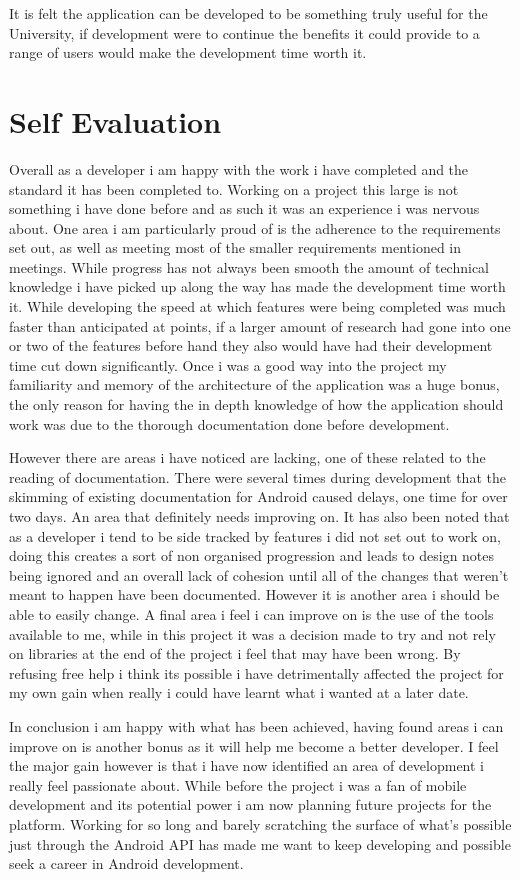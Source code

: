 It is felt the application can be developed to be something truly useful for the University, if development were to continue the benefits it could provide to a range of users would make the development time worth it. 
\section{Self Evaluation}
Overall as a developer i am happy with the work i have completed and the standard it has been completed to. Working on a project this large is not something i have done before and as such it was an experience i was nervous about. One area i am particularly proud of is the adherence to the requirements set out, as well as meeting most of the smaller requirements mentioned in meetings. While progress has not always been smooth the amount of technical knowledge i have picked up along the way has made the development time worth it. While developing the speed at which features were being completed was much faster than anticipated at points, if a larger amount of research had gone into one or two of the features before hand they also would have had their development time cut down significantly. Once i was a good way into the project my familiarity and memory of the architecture of the application was a huge bonus, the only reason for having the in depth knowledge of how the application should work was due to the thorough documentation done before development. 

However there are areas i have noticed are lacking, one of these related to the reading of documentation. There were several times during development that the skimming of existing documentation for Android caused delays, one time for over two days. An area that definitely needs improving on. It has also been noted that as a developer i tend to be side tracked by features i did not set out to work on, doing this creates a sort of non organised progression and leads to design notes being ignored and an overall lack of cohesion until all of the changes that weren't meant to happen have been documented. However it is another area i should be able to easily change. A final area i feel i can improve on is the use of the tools available to me, while in this project it was a decision made to try and not rely on libraries at the end of the project i feel that may have been wrong. By refusing free help i think its possible i have detrimentally affected the project for my own gain when really i could have learnt what i wanted at a later date. 

In conclusion i am happy with what has been achieved, having found areas i can improve on is another bonus as it will help me become a better developer. I feel the major gain however is that i have now identified an area of development i really feel passionate about. While before the project i was a fan of mobile development and its potential power i am now planning future projects for the platform. Working for so long and barely scratching the surface of what's possible just through the Android API has made me want to keep developing and possible seek a career in Android development. 


